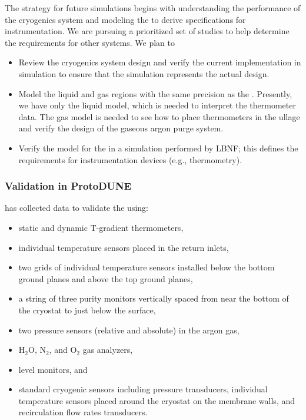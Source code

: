 The strategy for  future  simulations begins with understanding the performance of the  cryogenics system and modeling the  to derive specifications %
for instrumentation. We are pursuing a prioritized set of studies to help determine the requirements for other systems. We plan to 
\begin{itemize}
\item Review the   cryogenics system design and verify the current implementation in simulation %
to ensure that the simulation represents the actual design.
\item 
Model the  liquid and gas regions with the same precision as the . Presently, we have only the liquid model, which is needed to interpret the thermometer data. The gas model is needed to see how to place thermometers in the ullage and verify the design of the gaseous argon purge system.
\item Verify the  model for the  in a simulation performed by LBNF; this defines the requirements for instrumentation devices (e.g., thermometry).
\end{itemize}


\subsubsection{Validation in ProtoDUNE}
\label{sec:cfdvalid}
 has collected data to validate the  using: %
\begin{itemize}
\item static and dynamic T-gradient thermometers, 
\item individual temperature sensors placed in the return  inlets, 
\item two \twod grids of individual temperature sensors installed below the bottom ground planes and above the top ground planes, 
\item a string of three purity monitors vertically spaced from near the bottom of the cryostat to just below the  surface,
\item two pressure sensors (relative and absolute) in the argon gas,
\item H$_{2}$O, N$_{2}$, and O$_{2}$ gas analyzers, 
\item {} level monitors, and
\item standard cryogenic sensors including pressure transducers, individual temperature sensors placed around
the cryostat on the membrane walls, and recirculation flow rates transducers.
\end{itemize}


